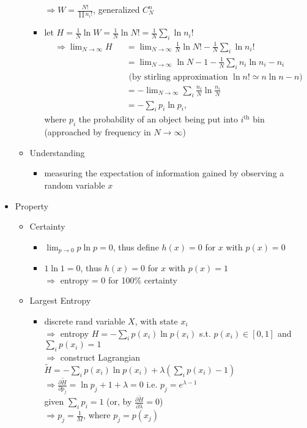 \begin{itemize}
\begin{itemize}
\begin{itemize}
		$\Rightarrow W=\frac{N!}{\prod n_i!}$, generalized $C_N^n$
		\item let $H=\frac1N\ln W = \frac1N\ln N!=\frac1N\sum_i\ln n_i!$ \\
		$\displaystyle \begin{alignedat}{2}
		&\Rightarrow \lim_{N\rightarrow\infty}H &&= \lim_{N\rightarrow\infty}\frac{1}{N}\ln N! - \frac{1}{N}\sum_i\ln n_i! \\
		& &&=\lim_{N\rightarrow\infty} \ln N -1 - \frac{1}{N}\sum_i n_i\ln n_i - n_i \\
		& && \text{ (by stirling approximation } \ln n!\simeq n\ln n - n) \\
		& &&= -\lim_{N\rightarrow \infty} \sum_i \frac{n_i}{N}\ln \frac{n_i}{N} \\
		& &&= -\sum_i p_i\ln p_i, 
		\end{alignedat}$ \\
		where $p_i$ the probability of an object being put into $i^\text{th}$ bin (approached by frequency in $N\rightarrow\infty$)
		\end{itemize}
	\item Understanding
		\begin{itemize}
		\item measuring the expectation of information gained by observing a random variable $x$
		\end{itemize}
	\end{itemize}
\item Property
	\begin{itemize}
	\item Certainty
		\begin{itemize}
		\item $\lim_{p\rightarrow0}p\ln p = 0$, thus define $h(x)=0$ for $x$ with $p(x)=0$
		\item $1\ln 1 = 0$, thus $h(x)=0$ for $x$ with $p(x)=1$ \\
		$\Rightarrow$ entropy = 0 for 100\% certainty
		\end{itemize}
	\item Largest Entropy
		\begin{itemize}
		\item discrete rand variable $X$, with state $x_i$ \\
		$\Rightarrow$ entropy $H = -\sum_i p(x_i)\ln p(x_i)$ s.t. $p(x_i)\in[0,1]$ and $\sum_i p(x_i)=1$ \\
		$\Rightarrow$ construct Lagrangian $\tilde H = -\sum_i p(x_i)\ln p(x_i) + \lambda \left( \sum_i p(x_i) - 1 \right)$ \\
		$\Rightarrow \frac{\partial \tilde{H}}{\partial p_j} = \ln p_j + 1 + \lambda = 0$ i.e. $p_j=e^{\lambda-1}$ \\
		given $\sum_i p_i = 1$ (or, by $\frac{\partial \tilde{H}}{\partial \lambda}=0$) \\
		$\Rightarrow p_j = \frac1M$, where $p_j=p(x_j)$
		\end{itemize}
	\end{itemize}

\end{itemize}


